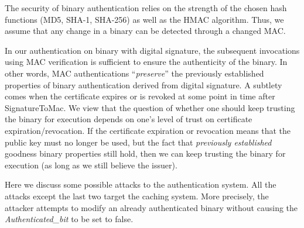 The security of binary authentication relies on the strength
of the chosen hash functions (MD5, SHA-1, SHA-256) as well as
the HMAC algorithm.
Thus, we assume that any change in a binary can be detected through a changed MAC.

In our authentication on binary with digital signature, 
the subsequent invocations using MAC verification is sufficient 
to ensure the authenticity of the binary.
In other words, MAC authentications ``{\em preserve}'' the previously
established properties of binary authentication derived from digital signature.
A subtlety comes when the certificate expires or is revoked 
at some point in time after SignatureToMac.
We view that the question of whether one should keep trusting the binary for execution
depends on one's level of trust on certificate expiration/revocation.
If the certificate expiration or revocation means 
that the public key must no longer be used,
but the fact that {\em previously established} goodness binary properties still hold,
then we can keep trusting the binary for execution (as long as we still believe the issuer).


Here we discuss some possible attacks to the authentication system.
All the attacks except the last two target the caching system.
More precisely, the attacker attempts to modify an already authenticated
binary without causing the {\it Authenticated\_bit} to be set to false.

